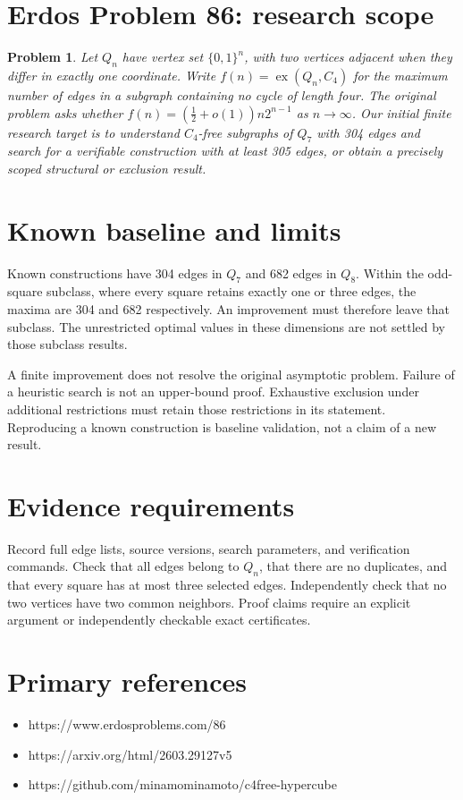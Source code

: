 \documentclass{article}
\newtheorem{problem}{Problem}
\begin{document}
\section*{Erdos Problem 86: research scope}
\begin{problem}
Let $Q_n$ have vertex set $\{0,1\}^n$, with two vertices adjacent when they
differ in exactly one coordinate. Write $f(n)=\operatorname{ex}(Q_n,C_4)$
for the maximum number of edges in a subgraph containing no cycle of length
four. The original problem asks whether
$f(n)=(\tfrac12+o(1))n2^{n-1}$ as $n\to\infty$.
Our initial finite research target is to understand $C_4$-free subgraphs of
$Q_7$ with 304 edges and search for a verifiable construction with at least
305 edges, or obtain a precisely scoped structural or exclusion result.
\end{problem}

\section*{Known baseline and limits}
Known constructions have 304 edges in $Q_7$ and 682 edges in $Q_8$.
Within the odd-square subclass, where every square retains exactly one or
three edges, the maxima are 304 and 682 respectively. An improvement must
therefore leave that subclass. The unrestricted optimal values in these
dimensions are not settled by those subclass results.

A finite improvement does not resolve the original asymptotic problem.
Failure of a heuristic search is not an upper-bound proof. Exhaustive
exclusion under additional restrictions must retain those restrictions
in its statement. Reproducing a known construction is baseline validation,
not a claim of a new result.

\section*{Evidence requirements}
Record full edge lists, source versions, search parameters, and verification
commands. Check that all edges belong to $Q_n$, that there are no duplicates,
and that every square has at most three selected edges. Independently check
that no two vertices have two common neighbors. Proof claims require an
explicit argument or independently checkable exact certificates.

\section*{Primary references}
\begin{itemize}
\item https://www.erdosproblems.com/86
\item https://arxiv.org/html/2603.29127v5
\item https://github.com/minamominamoto/c4free-hypercube
\end{itemize}
\end{document}

